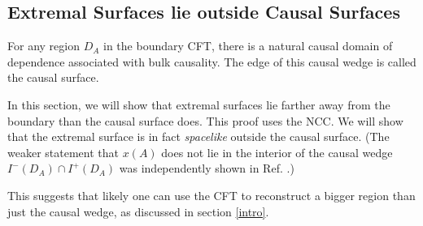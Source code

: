 \documentclass{article}
\begin{document}
\subsection{Extremal Surfaces lie outside Causal Surfaces}\label{causal}

For any region $D_A$ in the boundary CFT, there is a natural causal domain of dependence associated with bulk causality.  The edge of this causal wedge is called the causal surface.

In this section, we will show that extremal surfaces lie farther away from the boundary than the causal surface does.  This proof uses the NCC.  We will show that the extremal surface is in fact \emph{spacelike} outside the causal surface.  (The weaker statement that $x(A)$ does not lie in the interior of the causal wedge $I^-(D_A) \cap I^+(D_A)$ was independently shown in Ref. \cite{HR12}.)

This suggests that likely one can use the CFT to reconstruct a bigger region than just the causal wedge, as discussed in section \ref{intro}.
\end{document}
